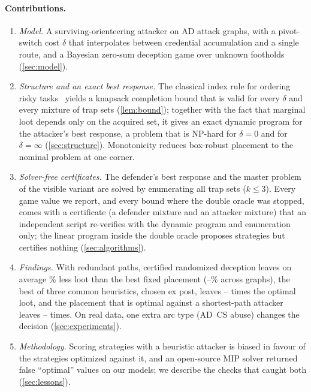 \documentclass[runningheads]{llncs}
\begin{document}
\paragraph{Contributions.}
\begin{enumerate}
\item \emph{Model.} A surviving-orienteering attacker on AD attack graphs, with a pivot-switch cost $\delta$ that interpolates between credential accumulation and a single route, and a Bayesian zero-sum deception game over unknown footholds (\cref{sec:model}).
\item \emph{Structure and an exact best response.} The classical index rule for ordering risky tasks~\cite{rothkopf1966,kadane1969quiz} yields a knapsack completion bound that is valid for every $\delta$ and every mixture of trap sets (\cref{lem:bound}); together with the fact that marginal loot depends only on the acquired set, it gives an exact dynamic program for the attacker's best response, a problem that is NP-hard for $\delta=0$ and for $\delta=\infty$ (\cref{sec:structure}). Monotonicity reduces box-robust placement to the nominal problem at one corner.
\item \emph{Solver-free certificates.} The defender's best response and the master problem of the visible variant are solved by enumerating all trap sets ($k\le3$). Every game value we report, and every bound where the double oracle was stopped, comes with a certificate (a defender mixture and an attacker mixture) that an independent script re-verifies with the dynamic program and enumeration only; the linear program inside the double oracle proposes strategies but certifies nothing (\cref{sec:algorithms}).
\item \emph{Findings.} With redundant paths, certified randomized deception leaves on average \RedPct\% less loot than the best fixed placement (\RedMin--\RedMax\% across graphs), the best of three common heuristics, chosen ex post, leaves \HeurOverMixMin--\HeurOverMixMax{} times the optimal loot, and the placement that is optimal against a shortest-path attacker~\cite{ngo2024catch} leaves \SpOverMixMin--\SpOverMixMax{} times. On real data, one extra arc type (AD~CS abuse) changes the decision (\cref{sec:experiments}).
\item \emph{Methodology.} Scoring strategies with a heuristic attacker is biased in favour of the strategies optimized against it, and an open-source MIP solver returned false ``optimal'' values on our models; we describe the checks that caught both (\cref{sec:lessons}).
\end{enumerate}
\end{document}
